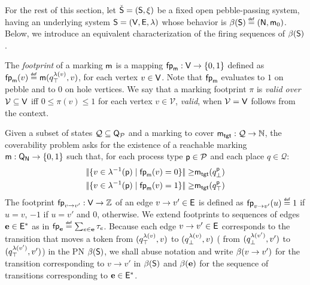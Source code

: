 For the rest of this section, let $\check{\mathsf{S}}= (\mathsf{S},\xi)$ be
a fixed open pebble-passing system, having an underlying system
$\mathsf{S}=(\mathsf{V},\mathsf{E},\lambda)$ whose behavior is $\beta({\mathsf{S}}) \stackrel{\scriptscriptstyle{\mathsf{def}}}{=}
(\mathsf{N},\mathsf{m}_0)$. Below, we introduce an equivalent characterization
of the firing sequences of $\beta({\mathsf{S}})$.

The \emph{footprint} of a marking $\mathsf{m}$ is a mapping $\mathsf{fp}_{\mathsf{m}}
: \mathsf{V} \to {\{ {0,1} \}}$ defined as $\mathsf{fp}_{\mathsf{m}}(v) \stackrel{\scriptscriptstyle{\mathsf{def}}}{=}
\mathsf{m}(q^{\lambda(v)}_\top,v)$, for each vertex $v \in \mathsf{V}$. Note
that $\mathsf{fp}_{\mathsf{m}}$ evaluates to $1$ on pebble and to $0$ on hole
vertices. We say that a marking footprint $\pi$ is \emph{valid over
  $\mathcal{V}\subseteq\mathsf{V}$} iff $0 \leq \pi(v) \leq 1$ for each
vertex $v \in \mathcal{V}$, \resp \emph{valid}, when
$\mathcal{V}=\mathsf{V}$ follows from the context.

Given a subset of states $\mathcal{Q} \subseteq
\mathsf{Q}_{\mathcal{P}}$ and a marking to cover $\mathsf{m}_\mathsf{tgt}: \mathcal{Q}
\rightarrow\mathbb{N}$, the coverability problem asks for the existence of a
reachable marking $\mathsf{m}:\mathsf{Q}_{\mathsf{N}} \rightarrow{\{ {0,1} \}}$ such
that, for each process type $\mathsf{p}\in\mathcal{P}$ and each place $q \in
\mathcal{Q}$: 
\begin{align}
  |\!|{{\{ {v\in\lambda^{-1}(\mathsf{p}) \mid \mathsf{fp}_{\mathsf{m}}(v) = 0} \}}}|\!| \geq & \mathsf{m}_\mathsf{tgt}(q^{\mathsf{p}}_\bot) \label{eq1:cover} \\
  |\!|{{\{ {v\in\lambda^{-1}(\mathsf{p}) \mid \mathsf{fp}_{\mathsf{m}}(v) = 1} \}}}|\!| \geq & \mathsf{m}_\mathsf{tgt}(q^{\mathsf{p}}_\top) \label{eq2:cover}
\end{align}
The footprint $\mathsf{fp}_{v \to v'} : \mathsf{V} \to \mathbb{Z}$ of an edge $v\to v'
\in \mathsf{E}$ is defined as $\mathsf{fp}_{v \to v'}(u) \stackrel{\scriptscriptstyle{\mathsf{def}}}{=} 1$ if $u = v$,
$-1$ if $u = v'$ and $0$, otherwise.
We extend footprints to sequences of edges $\mathbf{e} \in \mathsf{E}^*$ as
in $\mathsf{fp}_{\mathbf{e}} \stackrel{\scriptscriptstyle{\mathsf{def}}}{=} \sum_{e \in \mathbf{e}} \tau_e$. Because each
edge $v \to v' \in \mathsf{E}$ corresponds to the transition that moves a
token from $(q^{\lambda(v)}_\top,v)$ to $(q^{\lambda(v)}_\bot,v)$ (\resp
from $(q^{\lambda(v')}_\bot,v')$ to $(q^{\lambda(v')}_\top,v')$) in the PN
$\beta({\mathsf{S}})$, we shall abuse notation and write $\beta({v \to v'})$
for the transition corresponding to $v \to v'$ in $\beta({\mathsf{S}})$ and
$\beta({\mathbf{e}})$ for the sequence of transitions corresponding to
$\mathbf{e} \in \mathsf{E}^*$.

